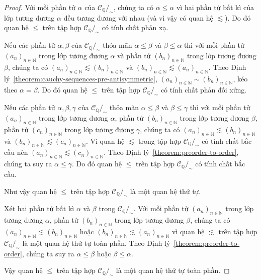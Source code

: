 \begin{proof}
    Với mỗi phần tử $\alpha$ của $\mathscr{C}_{\mathbb{Q}}/_{\sim}$, chúng ta có $\alpha\leq\alpha$ vì hai phần tử bất kì của lớp tương đương $\alpha$ đều tương đương với nhau (và vì vậy có quan hệ $\lesssim$). Do đó quan hệ $\leq$ trên tập hợp $\mathscr{C}_{\mathbb{Q}}/_{\sim}$ có tính chất phản xạ.

    Nếu các phần tử $\alpha, \beta$ của $\mathscr{C}_{\mathbb{Q}}/_{\sim}$ thỏa mãn $\alpha\leq \beta$ và $\beta\leq \alpha$ thì với mỗi phần tử ${(a_{n})}_{n\in\mathbb{N}}$ trong lớp tương đương $\alpha$ và phần tử ${(b_{n})}_{n\in\mathbb{N}}$ trong lớp tương đương $\beta$, chúng ta có ${(a_{n})}_{n\in\mathbb{N}}\lesssim {(b_{n})}_{n\in\mathbb{N}}$ và ${(b_{n})}_{n\in\mathbb{N}}\lesssim {(a_{n})}_{n\in\mathbb{N}}$. Theo Định lý~\ref{theorem:cauchy-sequences-pre-antisymmetric}, ${(a_{n})}_{n\in\mathbb{N}}\sim {(b_{n})}_{n\in\mathbb{N}}$, kéo theo $\alpha = \beta$. Do đó quan hệ $\leq$ trên tập hợp $\mathscr{C}_{\mathbb{Q}}/_{\sim}$ có tính chất phản đối xứng.

    Nếu các phần tử $\alpha, \beta, \gamma$ của $\mathscr{C}_{\mathbb{Q}}/_{\sim}$ thỏa mãn $\alpha\leq \beta$ và $\beta\leq \gamma$ thì với mỗi phần tử ${(a_{n})}_{n\in\mathbb{N}}$ trong lớp tương đương $\alpha$, phần tử ${(b_{n})}_{n\in\mathbb{N}}$ trong lớp tương đương $\beta$, phần tử ${(c_{n})}_{n\in\mathbb{N}}$ trong lớp tương đương $\gamma$, chúng ta có ${(a_{n})}_{n\in\mathbb{N}}\lesssim {(b_{n})}_{n\in\mathbb{N}}$ và ${(b_{n})}_{n\in\mathbb{N}}\lesssim {(c_{n})}_{n\in\mathbb{N}}$. Vì quan hệ $\lesssim$ trong tập hợp $\mathscr{C}_{\mathbb{Q}}/_{\sim}$ có tính chất bắc cầu nên ${(a_{n})}_{n\in\mathbb{N}}\lesssim {(c_{n})}_{n\in\mathbb{N}}$. Theo Định lý~\ref{theorem:preorder-to-order}, chúng ta suy ra $\alpha\leq \gamma$. Do đó quan hệ $\leq$ trên tập hợp $\mathscr{C}_{\mathbb{Q}}/_{\sim}$ có tính chất bắc cầu.

    Như vậy quan hệ $\leq$ trên tập hợp $\mathscr{C}_{\mathbb{Q}}/_{\sim}$ là một quan hệ thứ tự.

    Xét hai phần tử bất kì $\alpha$ và $\beta$ trong $\mathscr{C}_{\mathbb{Q}}/_{\sim}$. Với mỗi phần tử ${(a_{n})}_{n\in\mathbb{N}}$ trong lớp tương đương $\alpha$, phần tử ${(b_{n})}_{n\in\mathbb{N}}$ trong lớp tương đương $\beta$, chúng ta có ${(a_{n})}_{n\in\mathbb{N}}\lesssim {(b_{n})}_{n\in\mathbb{N}}$ hoặc ${(b_{n})}_{n\in\mathbb{N}}\lesssim {(a_{n})}_{n\in\mathbb{N}}$ vì quan hệ $\lesssim$ trên tập hợp $\mathscr{C}_{\mathbb{Q}}/_{\sim}$ là một quan hệ thứ tự toàn phần. Theo Định lý~\ref{theorem:preorder-to-order}, chúng ta suy ra $\alpha\leq \beta$ hoặc $\beta\leq \alpha$.

    Vậy quan hệ $\leq$ trên tập hợp $\mathscr{C}_{\mathbb{Q}}/_{\sim}$ là một quan hệ thứ tự toàn phần.
\end{proof}

